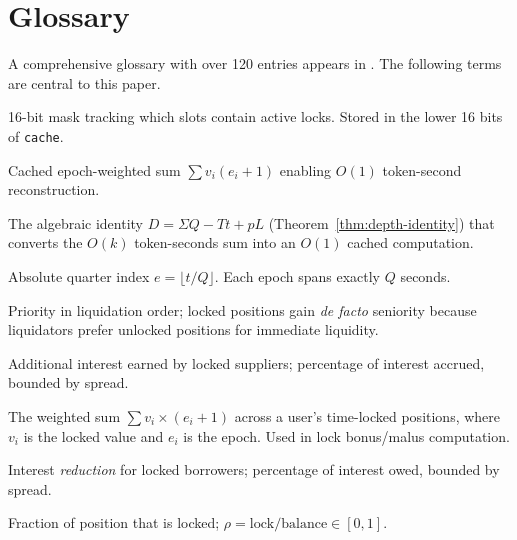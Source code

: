 \documentclass[10pt,a4paper,twocolumn]{article}
\begin{document}
\ifbundle\else
\section*{Glossary}

\noindent A comprehensive glossary with over 120 entries appears in \cite{ref}. The following terms are central to this paper.

\begin{description}[style=nextline, font=\normalfont\bfseries, leftmargin=1.5em]

\item[Bitmap] 16-bit mask tracking which slots contain active locks. Stored in the lower 16 bits of \texttt{cache}.

\item[Depth ($\Sigma$)] Cached epoch-weighted sum $\sum v_i(e_i{+}1)$ enabling $O(1)$ token-second reconstruction.

\item[Depth Identity] The algebraic identity $D = \Sigma Q - Tt + pL$ (Theorem~\ref{thm:depth-identity}) that converts the $O(k)$ token-seconds sum into an $O(1)$ cached computation.

\item[Epoch] Absolute quarter index $e = \lfloor t/Q \rfloor$. Each epoch spans exactly $Q$ seconds.

\item[Liquidation Seniority] Priority in liquidation order; locked positions gain \emph{de facto} seniority because liquidators prefer unlocked positions for immediate liquidity.

\item[Lock Bonus] Additional interest earned by locked suppliers; percentage of interest accrued, bounded by spread.

\item[Lock Depth] The weighted sum $\sum v_i \times (e_i + 1)$ across a user's time-locked positions, where $v_i$ is the locked value and $e_i$ is the epoch. Used in lock bonus/malus computation.

\item[Lock Malus] Interest \emph{reduction} for locked borrowers; percentage of interest owed, bounded by spread.

\item[Lock Ratio ($\rho$)] Fraction of position that is locked; $\rho = \text{lock}/\text{balance} \in [0, 1]$.


\end{description}
\end{document}
